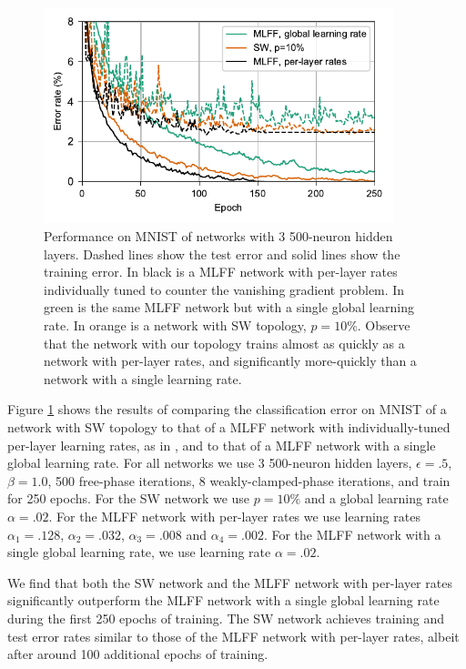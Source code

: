 \documentclass[utf8]{frontiersSCNS}
\begin{document}
\begin{figure}
	\centering
	\includegraphics[width=4in]{figures/mnist_3layer_error.pdf}
	\caption{Performance on MNIST of networks with 3 500-neuron hidden layers. Dashed lines show the test error and solid lines show the training error. In black is a MLFF network with per-layer rates individually tuned to counter the vanishing gradient problem. In green is the same MLFF network but with a single global learning rate. In orange is a network with SW topology, $p=10\%$. Observe that the network with our topology trains almost as quickly as a network with per-layer rates, and significantly more-quickly than a network with a single learning rate.}
	\label{fig:error}
\end{figure}

Figure \ref{fig:error} shows the results of comparing the classification error on MNIST of a network with SW topology to that of a MLFF network with individually-tuned per-layer learning rates, as in \citep{scellier17}, and to that of a MLFF network with a single global learning rate. For all networks we use 3 500-neuron hidden layers, $\epsilon=.5$, $\beta=1.0$, 500 free-phase iterations, 8 weakly-clamped-phase iterations, and train for 250 epochs. For the SW network we use $p=10\%$ and a global learning rate $\alpha=.02$. For the MLFF network with per-layer rates we use learning rates $\alpha_1=.128$, $\alpha_2=.032$, $\alpha_3=.008$ and $\alpha_4=.002$. For the MLFF network with a single global learning rate, we use learning rate $\alpha=.02$.

We find that both the SW network and the MLFF network with per-layer rates significantly outperform the MLFF network with a single global learning rate during the first 250 epochs of training. The SW network achieves training and test error rates similar to those of the MLFF network with per-layer rates, albeit after around 100 additional epochs of training.
\end{document}
